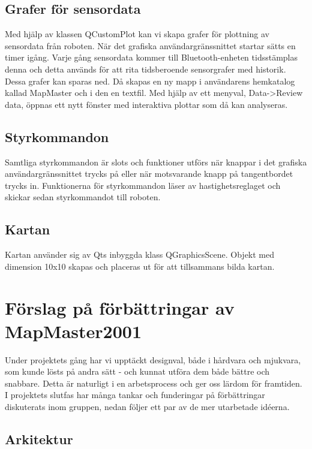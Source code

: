 \documentclass[a4paper,12pt,fleqn]{article}
\begin{document}
\subsection{Grafer för sensordata}
Med hjälp av klassen QCustomPlot kan vi skapa grafer för plottning av sensordata från roboten. När det grafiska användargränssnittet startar sätts en timer igång. Varje gång sensordata kommer till Bluetooth-enheten tidsstämplas denna och detta används för att rita tidsberoende sensorgrafer med historik. 
Dessa grafer kan sparas ned. Då skapas en ny mapp i användarens hemkatalog kallad MapMaster och i den en textfil. Med hjälp av ett menyval, Data->Review data, öppnas ett nytt fönster med interaktiva plottar som då kan analyseras.

\subsection{Styrkommandon}
Samtliga styrkommandon är slots och funktioner utförs när knappar i det grafiska användargränssnittet trycks på eller när motsvarande knapp på tangentbordet trycks in. 
Funktionerna för styrkommandon läser av hastighetsreglaget och skickar sedan styrkommandot till roboten. 
\subsection{Kartan}
Kartan använder sig av Qts inbyggda klass QGraphicsScene. Objekt med dimension 10x10 skapas och placeras ut för att tillsammans bilda kartan. 


\newpage
\section{Förslag på förbättringar av MapMaster2001}

Under projektets gång har vi upptäckt designval, både i hårdvara och mjukvara, som kunde lösts på andra sätt - och kunnat utföra dem både bättre och snabbare. Detta är naturligt i en arbetsprocess och ger oss lärdom för framtiden. I projektets slutfas har många tankar och funderingar på förbättringar diskuterats inom gruppen, nedan följer ett par av de mer utarbetade idéerna.

\subsection{Arkitektur \label{head:arch}}
\end{document}
